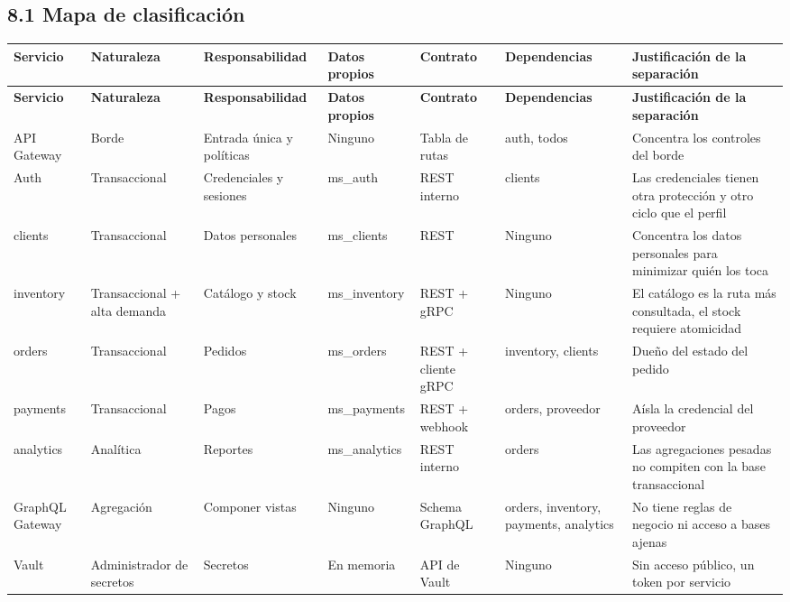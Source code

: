 \documentclass[10pt,letterpaper]{article}
\begin{document}
\subsection*{8.1 Mapa de clasificación}
{\scriptsize
\begin{longtable}{|P{\tabcolsep\relax}|P{\tabcolsep\relax}|P{\tabcolsep\relax}|P{\tabcolsep\relax}|P{\tabcolsep\relax}|P{\tabcolsep\relax}|P{\tabcolsep\relax}|}
\hline
\textbf{Servicio} & \textbf{Naturaleza} & \textbf{Responsabilidad} & \textbf{Datos propios} & \textbf{Contrato} & \textbf{Dependencias} & \textbf{Justificación de la separación} \\ \hline
\endfirsthead
\hline
\textbf{Servicio} & \textbf{Naturaleza} & \textbf{Responsabilidad} & \textbf{Datos propios} & \textbf{Contrato} & \textbf{Dependencias} & \textbf{Justificación de la separación} \\ \hline
\endhead
API Gateway & Borde & Entrada única y políticas & Ninguno  & Tabla de rutas & auth, todos & Concentra los controles del borde \\ \hline
Auth & Transaccional  & Credenciales y sesiones & ms\_\allowbreak{}auth & REST interno & clients & Las credenciales tienen otra protección y otro ciclo que el perfil \\ \hline
clients & Transaccional & Datos personales & ms\_\allowbreak{}clients & REST & Ninguno & Concentra los datos personales para minimizar quién los toca \\ \hline
inventory & Transaccional + alta demanda & Catálogo y stock & ms\_\allowbreak{}inventory & REST + gRPC & Ninguno & El catálogo es la ruta más consultada, el stock requiere atomicidad \\ \hline
orders & Transaccional & Pedidos & ms\_\allowbreak{}orders & REST + cliente gRPC & inventory, clients & Dueño del estado del pedido \\ \hline
payments & Transaccional  & Pagos & ms\_\allowbreak{}payments & REST + webhook & orders, proveedor & Aísla la credencial del proveedor  \\ \hline
analytics & Analítica & Reportes & ms\_\allowbreak{}analytics & REST interno & orders & Las agregaciones pesadas no compiten con la base transaccional \\ \hline
GraphQL Gateway & Agregación & Componer vistas & Ninguno & Schema GraphQL & orders, inventory, payments, analytics & No tiene reglas de negocio ni acceso a bases ajenas \\ \hline
Vault & Administrador de secretos & Secretos & En memoria & API de Vault & Ninguno & Sin acceso público, un token por servicio \\ \hline
\end{longtable}}
\end{document}

